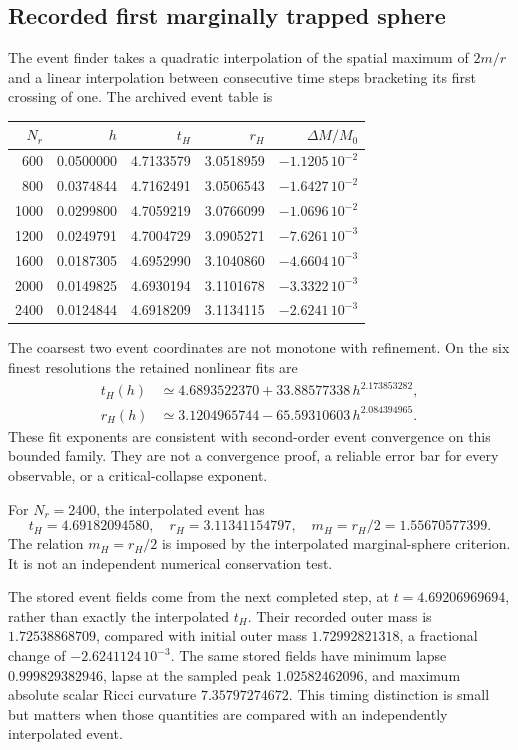 \subsection{Recorded first marginally trapped sphere}
The event finder takes a quadratic interpolation of the spatial maximum of $2m/r$ and a linear interpolation between consecutive time steps bracketing its first crossing of one. The archived event table is
\begin{center}\small
\begin{tabular}{rrrrr}
\toprule
$N_r$&$h$&$t_H$&$r_H$&$\Delta M/M_0$\\
\midrule
600&0.0500000&4.7133579&3.0518959&$-1.1205\,10^{-2}$\\
800&0.0374844&4.7162491&3.0506543&$-1.6427\,10^{-2}$\\
1000&0.0299800&4.7059219&3.0766099&$-1.0696\,10^{-2}$\\
1200&0.0249791&4.7004729&3.0905271&$-7.6261\,10^{-3}$\\
1600&0.0187305&4.6952990&3.1040860&$-4.6604\,10^{-3}$\\
2000&0.0149825&4.6930194&3.1101678&$-3.3322\,10^{-3}$\\
2400&0.0124844&4.6918209&3.1134115&$-2.6241\,10^{-3}$\\
\bottomrule
\end{tabular}
\end{center}
The coarsest two event coordinates are not monotone with refinement. On the six finest resolutions the retained nonlinear fits are
\begin{align}
 t_H(h)&\simeq4.6893522370+33.88577338\,h^{2.173853282},\\
 r_H(h)&\simeq3.1204965744-65.59310603\,h^{2.084394965}.
\end{align}
These fit exponents are consistent with second-order event convergence on this bounded family. They are not a convergence proof, a reliable error bar for every observable, or a critical-collapse exponent.

For $N_r=2400$, the interpolated event has
\begin{equation}
 t_H=4.69182094580,\quad r_H=3.11341154797,
 \quad m_H=r_H/2=1.55670577399.
\end{equation}
The relation $m_H=r_H/2$ is imposed by the interpolated marginal-sphere criterion. It is not an independent numerical conservation test.

The stored event fields come from the next completed step, at $t=4.69206969694$, rather than exactly the interpolated $t_H$. Their recorded outer mass is $1.72538868709$, compared with initial outer mass $1.72992821318$, a fractional change of $-2.6241124\,10^{-3}$. The same stored fields have minimum lapse $0.999829382946$, lapse at the sampled peak $1.02582462096$, and maximum absolute scalar Ricci curvature $7.35797274672$. This timing distinction is small but matters when those quantities are compared with an independently interpolated event.

